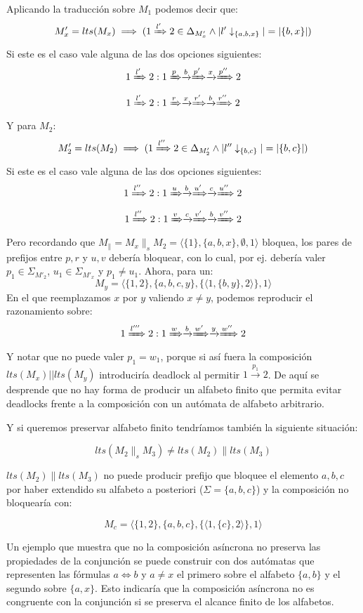 Aplicando la traducción sobre $M_1$ podemos decir que:
\[M'_x = lts(M_x) \implies ( 1 \xRightarrow[]{l'} 2 \in \Delta_{M'_x} \wedge |l'\downarrow_{\lbrace a,b,x\rbrace}|= |\lbrace b,x \rbrace | )\]
Si este es el caso vale alguna de las dos opciones siguientes:
\[1 \xRightarrow[]{l'} 2: 1 \xRightarrow[]{p}\xrightarrow{b}\xRightarrow[]{p'}\xrightarrow{x}\xRightarrow[]{p''}2\]
\[1 \xRightarrow[]{l'} 2: 1 \xRightarrow[]{r}\xrightarrow{x}\xRightarrow[]{r'}\xrightarrow{b}\xRightarrow[]{r''}2\]
Y para $M_2$:
\[M'_2 = lts(M_2) \implies ( 1 \xRightarrow[]{l''} 2 \in \Delta_{M'_2} \wedge |l''\downarrow_{\lbrace b,c\rbrace}|= |\lbrace b,c \rbrace | )\]
Si este es el caso vale alguna de las dos opciones siguientes:
\[1 \xRightarrow[]{l''} 2: 1 \xRightarrow[]{u}\xrightarrow{b}\xRightarrow[]{u'}\xrightarrow{c}\xRightarrow[]{u''}2\]
\[1 \xRightarrow[]{l''} 2: 1 \xRightarrow[]{v}\xrightarrow{c}\xRightarrow[]{v'}\xrightarrow{b}\xRightarrow[]{v''}2\]
Pero recordando que $M_{\parallel}=M_x \parallel_s M_2=\langle \lbrace 1 \rbrace, \lbrace a,b,x \rbrace, \emptyset, 1 \rangle$ bloquea, los pares de prefijos entre $p,r$ y $u,v$ debería bloquear, con lo cual, por ej. debería valer $p_1 \in \Sigma_{M'_2}$, $u_1 \in \Sigma_{M'_x}$ y $p_1 \neq u_1$. Ahora, para un:
\[M_y = \langle \lbrace 1,2 \rbrace, \lbrace a,b,c,y \rbrace, \lbrace\langle 1, \lbrace b,y \rbrace, 2 \rangle\rbrace, 1 \rangle\]
En el que reemplazamos $x$ por $y$ valiendo $x \neq y$, podemos reproducir el razonamiento sobre:
\[1 \xRightarrow[]{l'''} 2: 1 \xRightarrow[]{w}\xrightarrow{b}\xRightarrow[]{w'}\xrightarrow{y}\xRightarrow[]{w''}2\]
Y notar que no puede valer $p_1 = w_1$, porque si así fuera la composición $lts(M_x) || lts(M_y)$ introduciría deadlock al permitir $1 \xrightarrow{p_1} 2$. De aquí se desprende que no hay forma de producir un alfabeto finito que permita evitar deadlocks frente a la composición con un autómata de alfabeto arbitrario.

Y si queremos preservar alfabeto finito tendríamos también la siguiente situación:

\[lts(M_2 \parallel_s M_3) \neq lts(M_2)\parallel lts(M_3)\]

$lts(M_2)\parallel lts(M_3)$ no puede producir prefijo que bloquee el elemento $a,b,c$ por haber extendido su alfabeto a posteriori ($\Sigma = \lbrace a,b,c \rbrace$)
y la composición no bloquearía con:

\[M_c = \langle \lbrace 1,2 \rbrace, \lbrace a,b,c \rbrace, \lbrace\langle 1, \lbrace c \rbrace, 2 \rangle\rbrace, 1 \rangle\]

Un ejemplo que muestra que no la composición asíncrona no preserva las propiedades de la conjunción se puede construir con dos autómatas que representen las fórmulas $a \iff b$ y $a \neq x$ el primero sobre el alfabeto $\{a,b\}$ y el segundo sobre $\{a,x\}$. Esto indicaría que la composición asíncrona no es congruente con la conjunción si se preserva el alcance finito de los alfabetos.